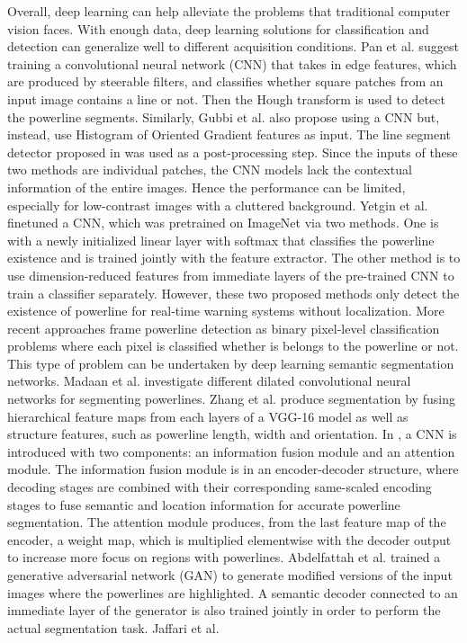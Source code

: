 \documentclass[journal]{IEEEtran}
\begin{document}
Overall, deep learning can help alleviate the problems that traditional computer vision faces. With enough data, deep learning solutions for classification and detection can generalize well to different acquisition conditions. Pan et al. \cite{related_work_chaofeng_pan_2016} suggest training a convolutional neural network (CNN) that takes in edge features, which are produced by steerable filters, and classifies whether square patches from an input image contains a line or not. Then the Hough transform is used to detect the powerline segments. Similarly, Gubbi et al. \cite{related_work_jayavardhana_gubbi} also propose using a CNN but, instead, use Histogram of Oriented Gradient features as input. The line segment detector proposed in \cite{lsd} was used as a post-processing step. Since the inputs of these two methods are individual patches, the CNN models lack the contextual information of the entire images. Hence the performance can be limited, especially for low-contrast images with a cluttered background. Yetgin et al. \cite{related_work_omer_emre_yetgin_2018} finetuned a CNN, which was pretrained on ImageNet \cite{deng2009imagenet} via two methods. One is with a newly initialized linear layer with softmax that classifies the powerline existence and is trained jointly with the feature extractor. The other method is to use dimension-reduced features from immediate layers of the pre-trained CNN to train a classifier separately. However, these two proposed methods only detect the existence of powerline for real-time warning systems without localization. More recent approaches \cite{related_work_rainesh_mandaan_2017,related_work_heng_zhang_2019,related_work_yan_li_2019,related_work_rabab_abdelfattah_2022,related_work_rabeea_haffari_2021} frame powerline detection as binary pixel-level classification problems where each pixel is classified whether is belongs to the powerline or not. This type of problem can be undertaken by deep learning semantic segmentation networks. Madaan et al. \cite{related_work_rainesh_mandaan_2017} investigate different dilated convolutional neural networks for segmenting powerlines. Zhang et al. \cite{related_work_heng_zhang_2019} produce segmentation by fusing hierarchical feature maps from each layers of a VGG-16 model \cite{vgg} as well as structure features, such as powerline length, width and orientation. In \cite{related_work_yan_li_2019}, a CNN is introduced with two components: an information fusion module and an attention module. The information fusion module is in an encoder-decoder structure, where decoding stages are combined with their corresponding same-scaled encoding stages to fuse semantic and location information for accurate powerline segmentation. The attention module produces, from the last feature map of the encoder, a weight map, which is multiplied elementwise with the decoder output to increase more focus on regions with powerlines. Abdelfattah et al. \cite{related_work_rabab_abdelfattah_2022} trained a generative adversarial network (GAN) to generate modified versions of the input images where the powerlines are highlighted. A semantic decoder connected to an immediate layer of the generator is also trained jointly in order to perform the actual segmentation task. Jaffari et al. \cite{related_work_rabeea_haffari_2021} 
\end{document}
